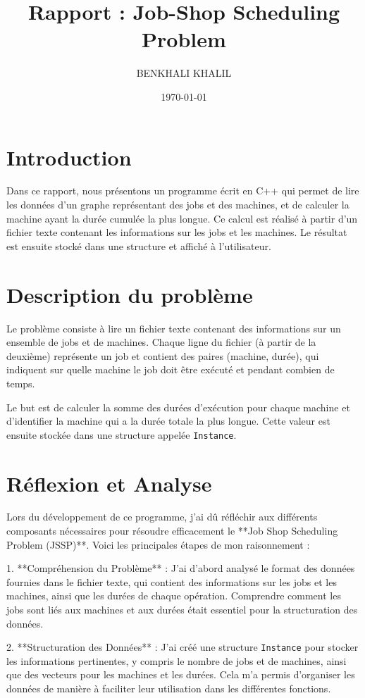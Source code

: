\documentclass[a4paper,12pt]{article}
\title{Rapport : Job-Shop Scheduling Problem}
\author{BENKHALI KHALIL}
\date{\today}
\begin{document}
\maketitle

\section{Introduction}

Dans ce rapport, nous présentons un programme écrit en C++ qui permet de lire les données d'un graphe représentant des jobs et des machines, et de calculer la machine ayant la durée cumulée la plus longue. Ce calcul est réalisé à partir d'un fichier texte contenant les informations sur les jobs et les machines. Le résultat est ensuite stocké dans une structure et affiché à l'utilisateur.

\section{Description du problème}

Le problème consiste à lire un fichier texte contenant des informations sur un ensemble de jobs et de machines. Chaque ligne du fichier (à partir de la deuxième) représente un job et contient des paires (machine, durée), qui indiquent sur quelle machine le job doit être exécuté et pendant combien de temps.

Le but est de calculer la somme des durées d'exécution pour chaque machine et d'identifier la machine qui a la durée totale la plus longue. Cette valeur est ensuite stockée dans une structure appelée \texttt{Instance}.

\section{Réflexion et Analyse}

Lors du développement de ce programme, j'ai dû réfléchir aux différents composants nécessaires pour résoudre efficacement le **Job Shop Scheduling Problem (JSSP)**. Voici les principales étapes de mon raisonnement :

1. **Compréhension du Problème** :
   J'ai d'abord analysé le format des données fournies dans le fichier texte, qui contient des informations sur les jobs et les machines, ainsi que les durées de chaque opération. Comprendre comment les jobs sont liés aux machines et aux durées était essentiel pour la structuration des données.

2. **Structuration des Données** :
   J'ai créé une structure \texttt{Instance} pour stocker les informations pertinentes, y compris le nombre de jobs et de machines, ainsi que des vecteurs pour les machines et les durées. Cela m'a permis d'organiser les données de manière à faciliter leur utilisation dans les différentes fonctions.
\end{document}
